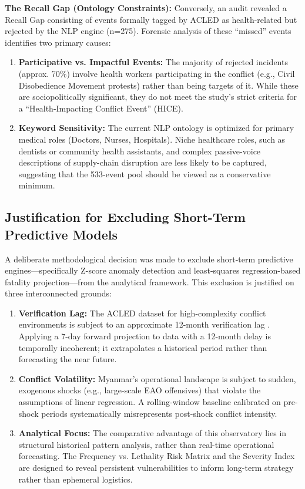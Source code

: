 \documentclass[conference]{IEEEtran}
\begin{document}
\textbf{The Recall Gap (Ontology Constraints):} Conversely, an audit revealed a Recall Gap consisting of events formally tagged by ACLED as health-related but rejected by the NLP engine (n=275). Forensic analysis of these ``missed'' events identifies two primary causes:
\begin{enumerate}
    \item \textbf{Participative vs. Impactful Events:} The majority of rejected incidents (approx. 70\%) involve health workers participating in the conflict (e.g., Civil Disobedience Movement protests) rather than being targets of it. While these are sociopolitically significant, they do not meet the study's strict criteria for a ``Health-Impacting Conflict Event'' (HICE).
    \item \textbf{Keyword Sensitivity:} The current NLP ontology is optimized for primary medical roles (Doctors, Nurses, Hospitals). Niche healthcare roles, such as dentists or community health assistants, and complex passive-voice descriptions of supply-chain disruption are less likely to be captured, suggesting that the 533-event pool should be viewed as a conservative minimum.
\end{enumerate}

\subsection{Justification for Excluding Short-Term Predictive Models}
A deliberate methodological decision was made to exclude short-term predictive engines---specifically Z-score anomaly detection and least-squares regression-based fatality projection---from the analytical framework. This exclusion is justified on three interconnected grounds:
\begin{enumerate}
    \item \textbf{Verification Lag:} The ACLED dataset for high-complexity conflict environments is subject to an approximate 12-month verification lag \cite{razakason2026delay}. Applying a 7-day forward projection to data with a 12-month delay is temporally incoherent; it extrapolates a historical period rather than forecasting the near future.
    \item \textbf{Conflict Volatility:} Myanmar's operational landscape is subject to sudden, exogenous shocks (e.g., large-scale EAO offensives) that violate the assumptions of linear regression. A rolling-window baseline calibrated on pre-shock periods systematically misrepresents post-shock conflict intensity.
    \item \textbf{Analytical Focus:} The comparative advantage of this observatory lies in structural historical pattern analysis, rather than real-time operational forecasting. The Frequency vs. Lethality Risk Matrix and the Severity Index are designed to reveal persistent vulnerabilities to inform long-term strategy rather than ephemeral logistics.
\end{enumerate}
\end{document}
